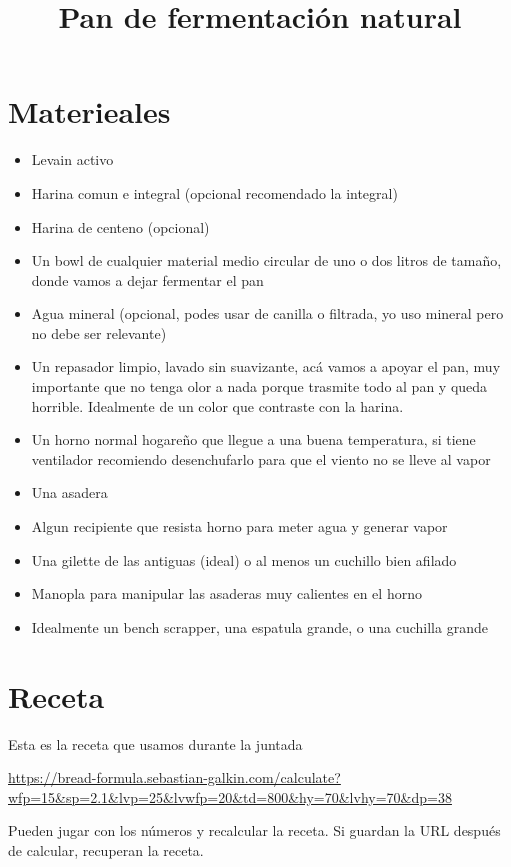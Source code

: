 \documentclass[10pt,a4paper]{article}
\title{Pan de fermentación natural}
\begin{document}
\maketitle
\tableofcontents

\section{Materieales}

\begin{itemize}
\item Levain activo
\item  Harina comun e integral (opcional recomendado la integral)
\item  Harina de centeno (opcional)
\item  Un bowl de cualquier material medio circular de uno o dos litros de tamaño, donde vamos a dejar fermentar el pan
\item  Agua mineral (opcional, podes usar de canilla o filtrada, yo uso mineral pero no debe ser relevante)
\item  Un repasador limpio, lavado sin suavizante, acá vamos a apoyar el pan,
  muy importante que no tenga olor a nada porque trasmite todo al pan y queda
  horrible. Idealmente de un color que contraste con la harina.
\item  Un horno normal hogareño que llegue a una buena temperatura, si tiene ventilador recomiendo desenchufarlo para que el viento no se lleve al vapor
\item  Una asadera
\item  Algun recipiente que resista horno para meter agua y generar vapor
\item  Una gilette de las antiguas (ideal) o al menos un cuchillo bien afilado
\item  Manopla para manipular las asaderas muy calientes en el horno
\item  Idealmente un bench scrapper, una espatula grande, o una cuchilla grande
\end{itemize}

\section{Receta}
Esta es la receta que usamos durante la juntada

\url{https://bread-formula.sebastian-galkin.com/calculate?wfp=15&sp=2.1&lvp=25&lvwfp=20&td=800&hy=70&lvhy=70&dp=38}

Pueden jugar con los números y recalcular la receta.  Si guardan la URL
después de calcular, recuperan la receta.
\end{document}

